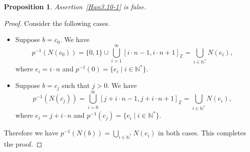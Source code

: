 \documentclass[10pt,a4paper]{amsart}
\newtheorem{prop}{Proposition}
\def\N{{\mathbb N}}
\def\Z{{\mathbb Z}}
\begin{document}
\begin{prop}
    \label{Han3.10False}
    Assertion~\ref{Han3.10-1} is false.
\end{prop}

\begin{proof}
Consider the following cases.
   \begin{itemize}
        \item Suppose $b=c_0$. We have 
             \[ p^{-1}(N(c_0)) = \{0,1 \} \cup \bigcup_{i=1}^{\infty} [i \cdot n -1, i \cdot n+1]_{\Z}
                = \bigcup_{i \in \N^*} N(e_i),
             \]
             where $e_i = i \cdot n$ and $p^{-1}(0) = \{ e_i \mid i \in \N^* \}$.
        \item Suppose $b=c_j$ such that $j > 0$. We have 
             \[ p^{-1}(N(c_j)) = \bigcup_{i=0}^{\infty} [j + i \cdot n -1, j + i \cdot n+1]_{\Z}
                = \bigcup_{i \in \N^*} N(e_i),
             \]
             where $e_i = j + i \cdot n$ and $p^{-1}(c_j) = \{ e_i \mid i \in \N^* \}$.
    \end{itemize}
    Therefore we have  $p^{-1}(N(b)) = \bigcup_{i \in \N^*} N(e_i)$ in both
    cases. This completes the proof.
\end{proof}
\end{document}
